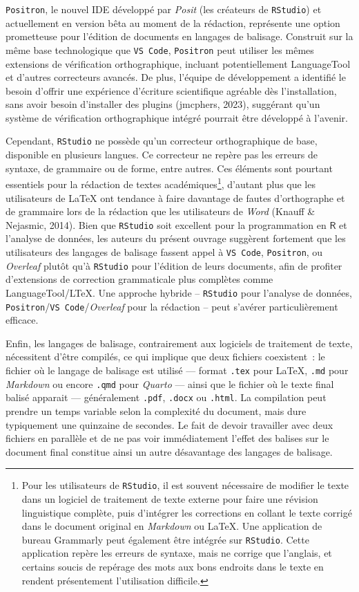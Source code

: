\documentclass[
  letterpaper,
  DIV=11,
  numbers=noendperiod,
  oneside]{scrreprt}
\begin{document}
\texttt{Positron}, le nouvel IDE développé par \emph{Posit} (les
créateurs de \texttt{RStudio}) et actuellement en version bêta au moment
de la rédaction, représente une option prometteuse pour l'édition de
documents en langages de balisage. Construit sur la même base
technologique que \texttt{VS\ Code}, \texttt{Positron} peut utiliser les
mêmes extensions de vérification orthographique, incluant
potentiellement LanguageTool et d'autres correcteurs avancés. De plus,
l'équipe de développement a identifié le besoin d'offrir une expérience
d'écriture scientifique agréable dès l'installation, sans avoir besoin
d'installer des plugins (jmcphers, 2023), suggérant qu'un système de
vérification orthographique intégré pourrait être développé à l'avenir.

Cependant, \texttt{RStudio} ne possède qu'un correcteur orthographique
de base, disponible en plusieurs langues. Ce correcteur ne repère pas
les erreurs de syntaxe, de grammaire ou de forme, entre autres. Ces
éléments sont pourtant essentiels pour la rédaction de textes
académiques\footnote{Pour les utilisateurs de \texttt{RStudio}, il est
  souvent nécessaire de modifier le texte dans un logiciel de traitement
  de texte externe pour faire une révision linguistique complète, puis
  d'intégrer les corrections en collant le texte corrigé dans le
  document original en \emph{Markdown} ou \LaTeX{}. Une application de
  bureau Grammarly peut également être intégrée sur \texttt{RStudio}.
  Cette application repère les erreurs de syntaxe, mais ne corrige que
  l'anglais, et certains soucis de repérage des mots aux bons endroits
  dans le texte en rendent présentement l'utilisation difficile.},
d'autant plus que les utilisateurs de \LaTeX{} ont tendance à faire
davantage de fautes d'orthographe et de grammaire lors de la rédaction
que les utilisateurs de \emph{Word} (Knauff \& Nejasmic, 2014). Bien que
\texttt{RStudio} soit excellent pour la programmation en \(\textsf{R}\)
et l'analyse de données, les auteurs du présent ouvrage suggèrent
fortement que les utilisateurs des langages de balisage fassent appel à
\texttt{VS\ Code}, \texttt{Positron}, ou \emph{Overleaf} plutôt qu'à
\texttt{RStudio} pour l'édition de leurs documents, afin de profiter
d'extensions de correction grammaticale plus complètes comme
LanguageTool/L\TeX. Une approche hybride -- \texttt{RStudio} pour
l'analyse de données,
\texttt{Positron}/\texttt{VS\ Code}/\emph{Overleaf} pour la rédaction --
peut s'avérer particulièrement efficace.

Enfin, les langages de balisage, contrairement aux logiciels de
traitement de texte, nécessitent d'être compilés, ce qui implique que
deux fichiers coexistent~: le fichier où le langage de balisage est
utilisé --- format \texttt{.tex} pour \LaTeX{}, \texttt{.md} pour
\emph{Markdown} ou encore \texttt{.qmd} pour \emph{Quarto} --- ainsi que
le fichier où le texte final balisé apparait --- généralement
\texttt{.pdf}, \texttt{.docx} ou \texttt{.html}. La compilation peut
prendre un temps variable selon la complexité du document, mais dure
typiquement une quinzaine de secondes. Le fait de devoir travailler avec
deux fichiers en parallèle et de ne pas voir immédiatement l'effet des
balises sur le document final constitue ainsi un autre désavantage des
langages de balisage.
\end{document}
